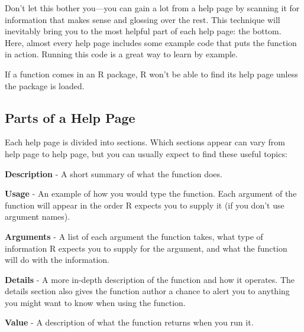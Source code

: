 \documentclass[
  letterpaper,
  DIV=11,
  numbers=noendperiod]{scrbook}
\begin{document}
Don't let this bother you---you can gain a lot from a help page by
scanning it for information that makes sense and glossing over the rest.
This technique will inevitably bring you to the most helpful part of
each help page: the bottom. Here, almost every help page includes some
example code that puts the function in action. Running this code is a
great way to learn by example.

\begin{tcolorbox}[enhanced jigsaw, breakable, colback=white, colbacktitle=quarto-callout-warning-color!10!white, arc=.35mm, bottomrule=.15mm, coltitle=black, left=2mm, rightrule=.15mm, colframe=quarto-callout-warning-color-frame, leftrule=.75mm, opacitybacktitle=0.6, bottomtitle=1mm, toptitle=1mm, titlerule=0mm, opacityback=0, title=\textcolor{quarto-callout-warning-color}{\faExclamationTriangle}\hspace{0.5em}{Warning}, toprule=.15mm]

If a function comes in an R package, R won't be able to find its help
page unless the package is loaded.

\end{tcolorbox}

\subsection{Parts of a Help Page}\label{parts-of-a-help-page}

Each help page is divided into sections. Which sections appear can vary
from help page to help page, but you can usually expect to find these
useful topics:

\textbf{Description} - A short summary of what the function does.

\textbf{Usage} - An example of how you would type the function. Each
argument of the function will appear in the order R expects you to
supply it (if you don't use argument names).

\textbf{Arguments} - A list of each argument the function takes, what
type of information R expects you to supply for the argument, and what
the function will do with the information.

\textbf{Details} - A more in-depth description of the function and how
it operates. The details section also gives the function author a chance
to alert you to anything you might want to know when using the function.

\textbf{Value} - A description of what the function returns when you run
it.
\end{document}
